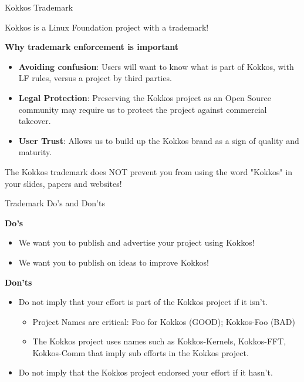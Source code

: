 \begin{frame}[fragile]{Kokkos Trademark}

Kokkos is a Linux Foundation project with a trademark!

\textbf{Why trademark enforcement is important}
\begin{itemize}
\item{\textbf{Avoiding confusion}: Users will want to know what is part of Kokkos, with LF rules, versus a project by third parties.}
\item{\textbf{Legal Protection}: Preserving the Kokkos project as an Open Source community may require us to protect the project against commercial takeover.}
\item{\textbf{User Trust}: Allows us to build up the Kokkos brand as a sign of quality and maturity.}
\end{itemize}

\begin{center}
The Kokkos trademark does NOT prevent you from using the word "Kokkos" in your slides, papers and websites!
\end{center}

\end{frame}


\begin{frame}[fragile]{Trademark Do's and Don'ts}

\textbf{Do's}

\begin{itemize}
\item{We want you to publish and advertise your project using Kokkos!}
\item{We want you to publish on ideas to improve Kokkos!}
\end{itemize}

\textbf{Don'ts}

\begin{itemize}
\item{Do not imply that your effort is part of the Kokkos project if it isn't.}
\begin{itemize}
\item{Project Names are critical: Foo for Kokkos (GOOD); Kokkos-Foo (BAD)}
\item{The Kokkos project uses names such as Kokkos-Kernels, Kokkos-FFT, Kokkos-Comm that imply sub efforts in the Kokkos project.}
\end{itemize}
\item{Do not imply that the Kokkos project endorsed your effort if it hasn't.}
\end{itemize}

\end{frame}


